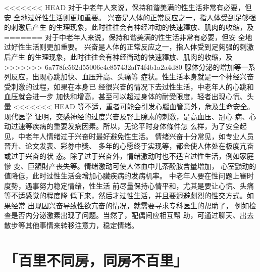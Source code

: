\documentclass[12pt,UTF8]{ctexbook}
\begin{document}
<<<<<<< HEAD
对于中老年人来说，保持和谐美满的性生活非常有必要，但安
全地过好性生活则更加重要。
兴奋是人体的正常反应之一，指人体受到足够强的刺激后产生
的生理现象，此时往往会有神经冲动的快速釋放、肌肉的收缩，及
=======
对于中老年人来说，保持和谐美满的性生活非常有必要，但安
全地过好性生活则更加重要。
兴奋是人体的正常反应之一，指人体受到足夠强的刺激后产生
的生理现象，此时往往会有神经衝动的快速釋放、肌肉的收缩，及
>>>>>>> 6a778fc562d55006c4c857432af74f4b1a2a4d80
腺体分泌的增加等一系列反应，出现心跳加快、血压升高、头痛等
症状。性生活本身就是一个神经兴奋受刺激的过程，如果在本身已
经很兴奋的情况下去过性生活，中老年人的心跳和血压就会进一步
加快和增高，甚至可以超过身体的耐受限度，轻者出现心慌、头暈
<<<<<<< HEAD
等不适，重者可能会引发心腦血管意外，危及生命安全。现代医学
证明，交感神经的过度兴奋及腎上腺素的刺激，是高血压、冠心
病、心动过速等疾病的重要发病因素。所以，无论平时身体條件怎
么样，为了安全起见，中老年人情绪过于兴奋时最好避免性生活。
情绪兴奋十分常见，如专业人员晉升、论文发表、彩券中獎、
多年的心愿终于实现等，都会使人体处在极度亢奋或过于兴奋的状
态。除了过于兴奋外，情绪激动时也不适宜过性生活，例如家庭慘
变、巨額財产丧失等。情绪激动可使人体血中儿茶酚胺含量增加，
心室顫动的值降低，此时过性生活会增加心臟疾病的发病机率。
中老年人要在性问题上審时度勢，遇事努力稳定情绪，性生活
前尽量保持心情平和，尤其是要让心慌、头痛等不适感觉的程度降
低下来，然后才过性生活，并且要迥避劇烈的性交方式。如果经常
出现因兴奋导致性欲亢奋的情况，就需要寻求专科医生的帮助了，
例如检查是否内分泌激素出现了问题。当然了，配偶间应相互帮
助，可通过聊天、出去散步等其他事情来转移注意力，稳定情绪。

\section{「百里不同房，同房不百里」}
\end{document}
